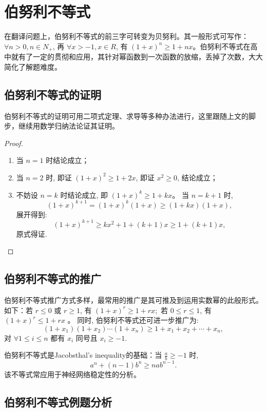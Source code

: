 \chapter{伯努利不等式}

在翻译问题上，伯努利不等式的前三字可转变为贝努利。其一般形式可写作：$\forall n>0, n \in N_{+}$, 再 $\forall x>-1, x \in R$, 有 $(1+x)^{n} \geq 1+n x$。伯努利不等式在高中就有了一定的贯彻和应用，其针对幂函数到一次函数的放缩，丢掉了次数，大大简化了解题难度。

\section{伯努利不等式的证明}

伯努利不等式的证明可用二项式定理、求导等多种办法进行，这里跟随上文的脚步，继续用数学归纳法论证其证明。

\begin{proof}
  \begin{enumerate}
    \item 当 $n=1$ 时结论成立；
    \item 当 $n=2$ 时, 即证 $(1+x)^{2} \geq 1+2 x$, 即证 $x^{2} \geq 0$, 结论成立；
    \item 不妨设 $n=k$ 时结论成立, 即 $(1+x)^{k} \geq 1+k x$。
    当 $n=k+1$ 时, \[(1+x)^{k+1}=(1+x)^{k}(1+x) \geq(1+k x)(1+x),\]
    展开得到: \[(1+x)^{k+1} \geq k x^{2}+1+(k+1) x \geq 1+(k+1) x,\] 原式得证. \qedhere
  \end{enumerate}
\end{proof}



\section{伯努利不等式的推广}

伯努利不等式推广方式多样，最常用的推广是其可推及到运用实数幂的此般形式。如下：若 $r \leq 0$ 或 $r \geq 1$, 有 $(1+x)^{r} \geq 1+ r x;$ 若 $0 \leq r \leq 1$, 有 $(1+x)^{r} \leq 1+r x$ 。 同时, 伯努利不等式还可进一步推广为: \[\left(1+x_{1}\right)\left(1+x_{2}\right) \cdots\left(1+x_{n}\right) \geq 1+x_{1}+x_{2}+\cdots+x_{n},\] 对 $\forall 1 \leq i \leq n$ 都有 $x_{i}$ 同号且 $x_{i} \geq-1$.

伯努利不等式是Jacobsthal’s inequality的基础：当 $\frac{a}{b} \geq-1$ 时, \[a^{n}+(n-1) b^{n} \geq n a b^{n-1}.\]
该不等式常应用于神经网络稳定性的分析。


\section{伯努利不等式例题分析}

